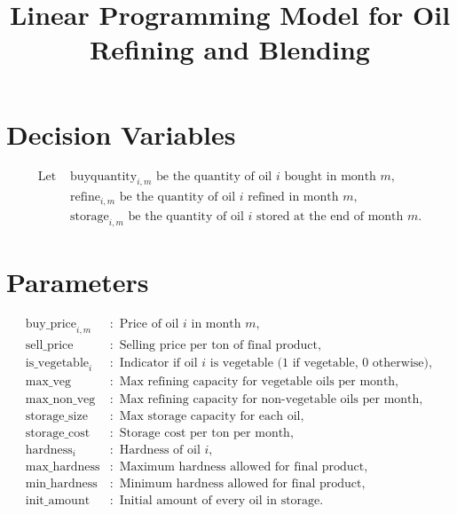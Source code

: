 \documentclass{article}
\begin{document}
\title{Linear Programming Model for Oil Refining and Blending}
\author{}
\date{}
\maketitle

\section*{Decision Variables}
\begin{align*}
    \text{Let } & \text{buyquantity}_{i,m} \text{ be the quantity of oil } i \text{ bought in month } m, \\
    & \text{refine}_{i,m} \text{ be the quantity of oil } i \text{ refined in month } m, \\
    & \text{storage}_{i,m} \text{ be the quantity of oil } i \text{ stored at the end of month } m. 
\end{align*}

\section*{Parameters}
\begin{align*}
    \text{buy\_price}_{i,m} &: \text{ Price of oil } i \text{ in month } m, \\
    \text{sell\_price} &: \text{ Selling price per ton of final product}, \\
    \text{is\_vegetable}_{i} &: \text{ Indicator if oil } i \text{ is vegetable (1 if vegetable, 0 otherwise)}, \\
    \text{max\_veg} &: \text{ Max refining capacity for vegetable oils per month}, \\
    \text{max\_non\_veg} &: \text{ Max refining capacity for non-vegetable oils per month}, \\
    \text{storage\_size} &: \text{ Max storage capacity for each oil}, \\
    \text{storage\_cost} &: \text{ Storage cost per ton per month}, \\
    \text{hardness}_{i} &: \text{ Hardness of oil } i, \\
    \text{max\_hardness} &: \text{ Maximum hardness allowed for final product}, \\
    \text{min\_hardness} &: \text{ Minimum hardness allowed for final product}, \\
    \text{init\_amount} &: \text{ Initial amount of every oil in storage}.
\end{align*}
\end{document}
